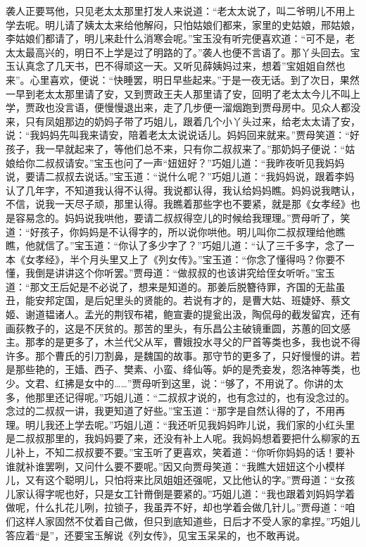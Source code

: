 \begin{parag}
    袭人正要骂他，只见老太太那里打发人来说道：“老太太说了，叫二爷明儿不用上学去呢。明儿请了姨太太来给他解闷，只怕姑娘们都来，家里的史姑娘，邢姑娘，李姑娘们都请了，明儿来赴什么消寒会呢。”宝玉没有听完便喜欢道：“可不是，老太太最高兴的，明日不上学是过了明路的了。”袭人也便不言语了。那丫头回去。宝玉认真念了几天书，巴不得顽这一天。又听见薛姨妈过来，想着”宝姐姐自然也来”。心里喜欢，便说：“快睡罢，明日早些起来。”于是一夜无话。到了次日，果然一早到老太太那里请了安，又到贾政王夫人那里请了安，回明了老太太今儿不叫上学，贾政也没言语，便慢慢退出来，走了几步便一溜烟跑到贾母房中。见众人都没来，只有凤姐那边的奶妈子带了巧姐儿，跟着几个小丫头过来，给老太太请了安，说：“我妈妈先叫我来请安，陪着老太太说说话儿。妈妈回来就来。”贾母笑道：“好孩子，我一早就起来了，等他们总不来，只有你二叔叔来了。”那奶妈子便说：“姑娘给你二叔叔请安。”宝玉也问了一声“妞妞好？”巧姐儿道：“我昨夜听见我妈妈说，要请二叔叔去说话。”宝玉道：“说什么呢？”巧姐儿道：“我妈妈说，跟着李妈认了几年字，不知道我认得不认得。我说都认得，我认给妈妈瞧。妈妈说我瞎认，不信，说我一天尽子顽，那里认得。我瞧着那些字也不要紧，就是那《女孝经》也是容易念的。妈妈说我哄他，要请二叔叔得空儿的时候给我理理。”贾母听了，笑道：“好孩子，你妈妈是不认得字的，所以说你哄他。明儿叫你二叔叔理给他瞧瞧，他就信了。”宝玉道：“你认了多少字了？”巧姐儿道：“认了三千多字，念了一本《女孝经》，半个月头里又上了《列女传》。”宝玉道：“你念了懂得吗？你要不懂，我倒是讲讲这个你听罢。”贾母道：“做叔叔的也该讲究给侄女听听。”宝玉道：“那文王后妃是不必说了，想来是知道的。那姜后脱簪待罪，齐国的无盐虽丑，能安邦定国，是后妃里头的贤能的。若说有才的，是曹大姑、班婕妤、蔡文姬、谢道韫诸人。孟光的荆钗布裙，鲍宣妻的提瓮出汲，陶侃母的截发留宾，还有画荻教子的，这是不厌贫的。那苦的里头，有乐昌公主破镜重圆，苏蕙的回文感主。那孝的是更多了，木兰代父从军，曹娥投水寻父的尸首等类也多，我也说不得许多。那个曹氏的引刀割鼻，是魏国的故事。那守节的更多了，只好慢慢的讲。若是那些艳的，王嫱、西子、樊素、小蛮、绛仙等。妒的是秃妾发，怨洛神等类，也少。文君、红拂是女中的……”贾母听到这里，说：“够了，不用说了。你讲的太多，他那里还记得呢。”巧姐儿道：“二叔叔才说的，也有念过的，也有没念过的。念过的二叔叔一讲，我更知道了好些。”宝玉道：“那字是自然认得的了，不用再理。明儿我还上学去呢。”巧姐儿道：“我还听见我妈妈昨儿说，我们家的小红头里是二叔叔那里的，我妈妈要了来，还没有补上人呢。我妈妈想着要把什么柳家的五儿补上，不知二叔叔要不要。”宝玉听了更喜欢，笑着道：“你听你妈妈的话！要补谁就补谁罢咧，又问什么要不要呢。”因又向贾母笑道：“我瞧大妞妞这个小模样儿，又有这个聪明儿，只怕将来比凤姐姐还强呢，又比他认的字。”贾母道：“女孩儿家认得字呢也好，只是女工针黹倒是要紧的。”巧姐儿道：“我也跟着刘妈妈学着做呢，什么扎花儿咧，拉锁子，我虽弄不好，却也学着会做几针儿。”贾母道：“咱们这样人家固然不仗着自己做，但只到底知道些，日后才不受人家的拿捏。”巧姐儿答应着“是”，还要宝玉解说《列女传》，见宝玉呆呆的，也不敢再说。
\end{parag}



